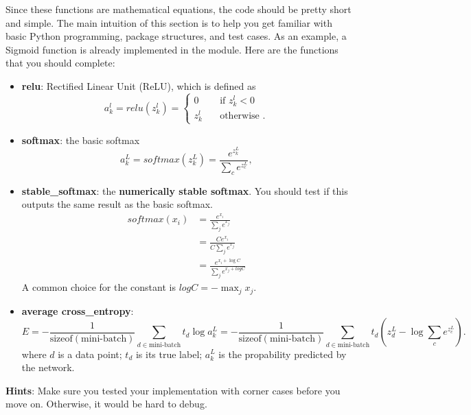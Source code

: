 \documentclass{article}
\begin{document}
Since these
functions are mathematical equations, the code should be pretty short
and simple. The main intuition of this section is to help you get familiar
with basic Python programming, package structures, and test cases. As an
example, a Sigmoid function is already implemented in the module. Here are
the functions that you should complete:
\begin{itemize}
\item \textbf{relu}: Rectified Linear Unit (ReLU), which is defined as
  \begin{equation*}
    a_k^l = relu(z_k^l) =
    \begin{cases}
      0       & \quad \text{if } z_k^l < 0\\
      z_k^l  & \quad \text{otherwise }.
    \end{cases}
\end{equation*}

\item \textbf{softmax}: the basic softmax
  \begin{equation}
  a_k^L = softmax(z_k^L) = \frac{e^{z_k^L}}{\sum_{c} e^{z_c^L}},
  \end{equation}

\item \textbf{stable\_softmax}: the \textbf{numerically stable softmax}. You should test
if this outputs the same result as the basic softmax.
\begin{align}
softmax(x_i) &= \frac{e^{x_i}}{\sum_j e^{x_j}} \\
&= \frac{C e^{x_i}}{C \sum_j e^{x_j}} \\
&= \frac{e^{x_i+\log C}}{\sum_j e^{x_j + log C}}
\end{align}
A common choice for the constant is $log C = -\max_{j} x_j$.

\item \textbf{average cross\_entropy}:
\begin{equation}
E = - \frac{1}{\text{sizeof}(\text{mini-batch})}\sum_{d \in  \text{mini-batch}} t_d \log a_k^L = - \frac{1}{\text{sizeof}(\text{mini-batch})} \sum_{d \in \text{mini-batch}} t_d (z_d^L - \log \sum_c e^{z_c^L}).
\end{equation}
where \(d\) is a data point; \(t_d\) is its true label; \(a_k^L\) is the
propability predicted by the network.

\end{itemize}

\noindent \textbf{Hints}: Make sure you tested your implementation with corner
cases before you move on. Otherwise, it would be hard to debug.
\end{document}
